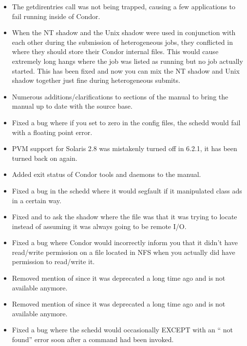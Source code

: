 \begin{itemize}
\item The getdirentries call was not being trapped, causing a few applications
to fail running inside of Condor.

\item When the NT shadow and the Unix shadow were used in conjunction with each
other during the submission of heterogeneous jobs, they conflicted in where 
they should store their Condor internal files. This would cause extremely
long hangs where the job was listed as running but no job actually started.
This has been fixed and now you can mix the NT shadow and Unix shadow
together just fine during heterogeneous submits.

\item Numerous additions/clarifications to sections of the manual to bring
the manual up to date with the source base.

\item Fixed a bug where if you set  to zero in the
config files, the schedd would fail with a floating point error.

\item PVM support for Solaris 2.8 was mistakenly turned off in 6.2.1,
it has been turned back on again.

\item Added exit status of Condor tools and daemons to the manual.

\item Fixed a bug in the schedd where it would segfault if it manipulated
class ads in a certain way.

\item Fixed  and  to ask the shadow where the
file was that it was trying to locate instead of assuming it was always going
to be remote I/O.

\item Fixed a bug where Condor would incorrectly inform you that it
didn't have read/write permission on a file located in NFS when you
actually did have permission to read/write it.

\item Removed mention of  since it was deprecated a
long time ago and is not available anymore.

\item Removed mention of  since it was deprecated a
long time ago and is not available anymore.

\item Fixed a bug where the schedd would occasionally EXCEPT with an
`` not found'' error soon after a 
command had been invoked.


\end{itemize}
